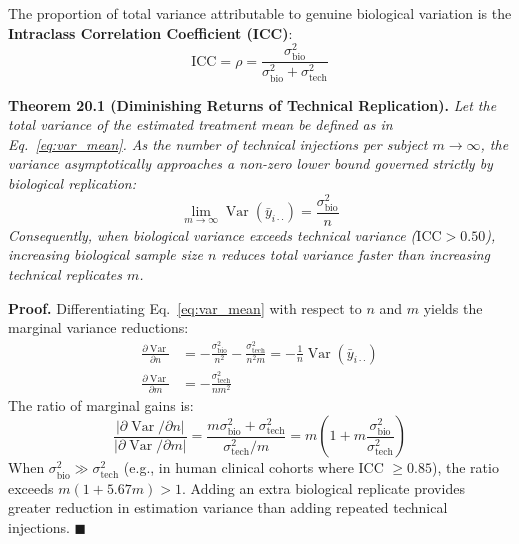 \documentclass[11pt,twoside,openright]{book}
\begin{document}
The proportion of total variance attributable to genuine biological variation is the \textbf{Intraclass Correlation Coefficient (ICC)}:
\begin{equation}
\text{ICC} = \rho = \frac{\sigma^2_{\text{bio}}}{\sigma^2_{\text{bio}} + \sigma^2_{\text{tech}}}
\label{eq:icc}
\end{equation}

\vspace{0.6em}
\noindent\textbf{Theorem 20.1 (Diminishing Returns of Technical Replication).}\enspace
\textit{Let the total variance of the estimated treatment mean be defined as in Eq.~\eqref{eq:var_mean}. As the number of technical injections per subject $m \to \infty$, the variance asymptotically approaches a non-zero lower bound governed strictly by biological replication:
\begin{equation}
\lim_{m \to \infty} \operatorname{Var}(\bar{y}_{i\cdot\cdot}) = \frac{\sigma^2_{\text{bio}}}{n}
\end{equation}
Consequently, when biological variance exceeds technical variance ($\text{ICC} > 0.50$), increasing biological sample size $n$ reduces total variance faster than increasing technical replicates $m$.}

\vspace{0.6em}
\noindent\textbf{Proof.}\enspace
Differentiating Eq.~\eqref{eq:var_mean} with respect to $n$ and $m$ yields the marginal variance reductions:
\begin{align}
\frac{\partial \operatorname{Var}}{\partial n} &= -\frac{\sigma^2_{\text{bio}}}{n^2} - \frac{\sigma^2_{\text{tech}}}{n^2 m} = -\frac{1}{n} \operatorname{Var}(\bar{y}_{i\cdot\cdot}) \\
\frac{\partial \operatorname{Var}}{\partial m} &= -\frac{\sigma^2_{\text{tech}}}{n m^2}
\end{align}
The ratio of marginal gains is:
\begin{equation}
\frac{|\partial \operatorname{Var} / \partial n|}{|\partial \operatorname{Var} / \partial m|} = \frac{m \sigma^2_{\text{bio}} + \sigma^2_{\text{tech}}}{\sigma^2_{\text{tech}} / m} = m \left( 1 + m \frac{\sigma^2_{\text{bio}}}{\sigma^2_{\text{tech}}} \right)
\end{equation}
When $\sigma^2_{\text{bio}} \gg \sigma^2_{\text{tech}}$ (e.g., in human clinical cohorts where ICC $\ge 0.85$), the ratio exceeds $m(1 + 5.67m) > 1$. Adding an extra biological replicate provides greater reduction in estimation variance than adding repeated technical injections. \hfill $\blacksquare$
\vspace{0.6em}
\end{document}
